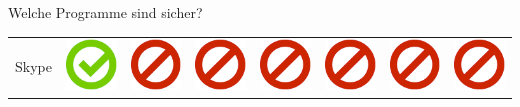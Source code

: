 \documentclass[final]{beamer}
\newlength{\twocolwid}
\begin{document}
\begin{frame}[t]
\begin{columns}[t, totalwidth=\textwidth]
\begin{column}{\twocolwid}
\begin{block}{Welche Programme sind sicher?}
\begin{tabular}{ l | C{4cm} | C{4.5cm} | C{4cm} | C{4.5cm} | C{4cm} | C{5cm} | C{3cm} | }
Skype & \includegraphics[scale=0.5]{pics/haken.png} & \includegraphics[scale=0.5]{pics/nohaken.png} & \includegraphics[scale=0.5]{pics/nohaken.png} & \includegraphics[scale=0.5]{pics/nohaken.png} & \includegraphics[scale=0.5]{pics/nohaken.png} & \includegraphics[scale=0.5]{pics/nohaken.png} & \includegraphics[scale=0.5]{pics/nohaken.png} \tabularnewline

\end{tabular}
\end{block}
\end{column}
\end{columns}
\end{frame}
\end{document}
